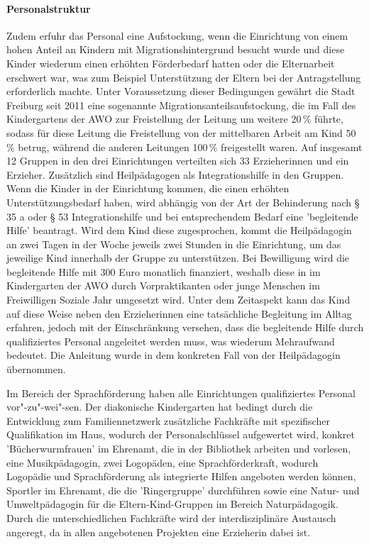 \paragraph{Personalstruktur}
Zudem erfuhr das Personal eine Aufstockung, wenn die Einrichtung von einem hohen Anteil an Kindern mit Migrationshintergrund besucht wurde und diese Kinder wiederum einen erhöhten Förderbedarf hatten oder die Elternarbeit erschwert war, was zum Beispiel Unterstützung der Eltern bei der Antragstellung erforderlich machte. Unter Voraussetzung dieser Bedingungen gewährt die Stadt Freiburg seit 2011 eine sogenannte Migrationsanteilsaufstockung, die im Fall des Kindergartens der AWO zur Freistellung der Leitung um weitere 20\,\% führte, sodass für diese Leitung die Freistellung von der mittelbaren Arbeit am Kind 50\,\% betrug, während die anderen Leitungen 100\,\% freigestellt waren. 
Auf insgesamt 12 Gruppen in den drei Einrichtungen verteilten sich 33 Erzieherinnen und ein Erzieher. Zusätzlich sind Heilpädagogen als Integrationshilfe in den Gruppen. Wenn die Kinder in der Einrichtung kommen, die einen erhöhten Unterstützungsbedarf haben, wird abhängig von der Art der Behinderung nach § 35 a oder § 53 Integrationshilfe und bei entsprechendem Bedarf eine 'begleitende Hilfe' beantragt. Wird dem Kind diese zugesprochen, kommt die Heilpädagogin an zwei Tagen in der Woche jeweils zwei Stunden in die Einrichtung, um das jeweilige Kind innerhalb der Gruppe zu unterstützen. Bei Bewilligung wird die begleitende Hilfe mit 300 Euro monatlich finanziert, weshalb diese in im Kindergarten der AWO durch Vorpraktikanten oder junge Menschen im Freiwilligen Soziale Jahr umgesetzt wird. Unter dem Zeitaspekt kann das Kind auf diese Weise neben den Erzieherinnen eine tatsächliche Begleitung im Alltag erfahren, jedoch mit der Einschränkung versehen, dass die begleitende Hilfe durch qualifiziertes Personal angeleitet werden muss, was wiederum Mehraufwand bedeutet. Die Anleitung wurde in dem konkreten Fall von der Heilpädagogin übernommen. 

Im Bereich der Sprachförderung haben alle Einrichtungen qualifiziertes Personal vor"-zu"-wei"-sen. Der diakonische Kindergarten hat bedingt durch die Entwicklung zum Familiennetzwerk zusätzliche Fachkräfte mit spezifischer Qualifikation im Haus, wodurch der Personalschlüssel aufgewertet wird, konkret 'Bücherwurmfrauen' im Ehrenamt, die in der Bibliothek arbeiten und vorlesen, eine Musikpädagogin, zwei Logopäden, eine Sprachförderkraft, wodurch Logopädie und Sprachförderung als integrierte Hilfen angeboten werden können, Sportler im Ehrenamt, die die 'Ringergruppe' durchführen sowie eine Natur- und Umweltpädagogin für die Eltern-Kind-Gruppen im Bereich Naturpädagogik. Durch die unterschiedlichen Fachkräfte wird der interdisziplinäre Austausch angeregt, da in allen angebotenen Projekten eine Erzieherin dabei ist.  

